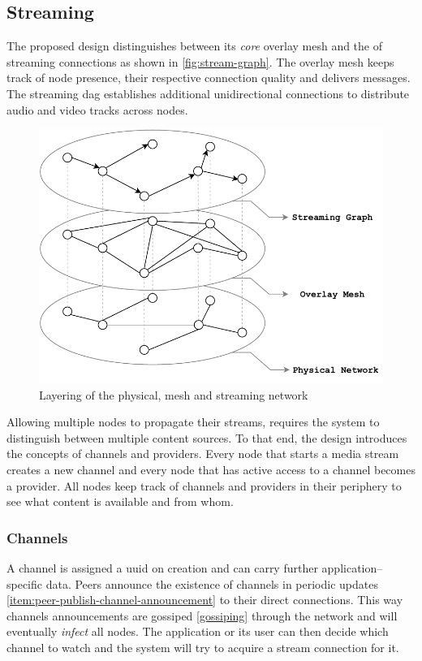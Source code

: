 \subsection{Streaming}\label{sec:design-stream}

The proposed design distinguishes between its \textit{core} overlay mesh and the  of streaming connections as shown in \vref{fig:stream-graph}. The overlay mesh keeps track of node presence, their respective connection quality and delivers messages. The streaming \gls{dag} establishes additional unidirectional connections to distribute audio and video tracks across nodes.

\begin{figure}
\centering
\includegraphics[width=.75\textwidth]{graphics/design/stream-graph.pdf}
\caption{Layering of the physical, mesh and streaming network}
\label{fig:stream-graph}
\end{figure}

Allowing multiple nodes to propagate their streams, requires the system to distinguish between multiple content sources. To that end, the design introduces the concepts of channels and providers. Every node that starts a media stream creates a new channel and every node that has active access to a channel becomes a provider. All nodes keep track of channels and providers in their periphery to see what content is available and from whom.

\subsubsection{Channels}\label{sec:design-stream-channel}
A channel is assigned a \gls{uuid} on creation and can carry further application–specific data. Peers announce the existence of channels in periodic updates \ref{item:peer-publish-channel-announcement} to their direct connections. This way channels announcements are gossiped \cref{gossiping} through the network and will eventually \textit{infect} all nodes. The application or its user can then decide which channel to watch and the system will try to acquire a stream connection for it.


